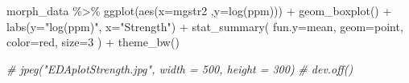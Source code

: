 \documentclass[
  11pt,
]{article}
\newenvironment{Shaded}{\begin{snugshade}}{\end{snugshade}}
\newcommand{\AttributeTok}[1]{\textcolor[rgb]{0.77,0.63,0.00}{#1}}
\newcommand{\CommentTok}[1]{\textcolor[rgb]{0.56,0.35,0.01}{\textit{#1}}}
\newcommand{\DecValTok}[1]{\textcolor[rgb]{0.00,0.00,0.81}{#1}}
\newcommand{\FunctionTok}[1]{\textcolor[rgb]{0.00,0.00,0.00}{#1}}
\newcommand{\NormalTok}[1]{#1}
\newcommand{\SpecialCharTok}[1]{\textcolor[rgb]{0.00,0.00,0.00}{#1}}
\newcommand{\StringTok}[1]{\textcolor[rgb]{0.31,0.60,0.02}{#1}}
\begin{document}
\begin{Shaded}
\begin{Highlighting}[]
\NormalTok{morph\_data }\SpecialCharTok{\%\textgreater{}\%}
  \FunctionTok{ggplot}\NormalTok{(}\FunctionTok{aes}\NormalTok{(}\AttributeTok{x=}\NormalTok{mgstr2 ,}\AttributeTok{y=}\FunctionTok{log}\NormalTok{(ppm))) }\SpecialCharTok{+}
  \FunctionTok{geom\_boxplot}\NormalTok{() }\SpecialCharTok{+}
  \FunctionTok{labs}\NormalTok{(}\AttributeTok{y=}\StringTok{"log(ppm)"}\NormalTok{, }\AttributeTok{x=}\StringTok{"Strength"}\NormalTok{)  }\SpecialCharTok{+}
  \FunctionTok{stat\_summary}\NormalTok{(}
    \AttributeTok{fun.y=}\NormalTok{mean,}
    \AttributeTok{geom=}\StringTok{\textquotesingle{}point\textquotesingle{}}\NormalTok{,}
    \AttributeTok{color=}\StringTok{\textquotesingle{}red\textquotesingle{}}\NormalTok{,}
    \AttributeTok{size=}\DecValTok{3}
\NormalTok{  ) }\SpecialCharTok{+}
  \FunctionTok{theme\_bw}\NormalTok{()}

\CommentTok{\# jpeg("EDAplotStrength.jpg", width = 500, height = 300)}
\CommentTok{\# dev.off()}
\end{Highlighting}
\end{Shaded}
\end{document}
